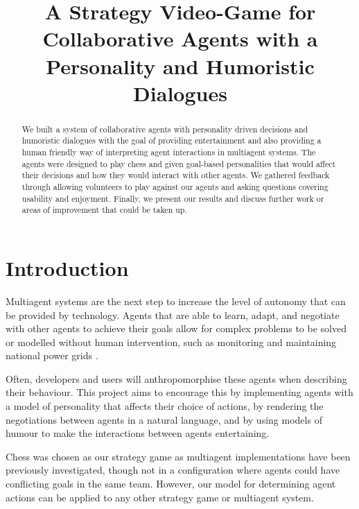\documentclass[conference]{IEEEtran}
\begin{document}
\title{A Strategy Video-Game for Collaborative Agents with a Personality and Humoristic Dialogues\\
}

\author{
\and
{}
\and
{}
}

\maketitle

\begin{abstract}

	We built a system of collaborative agents with personality driven decisions and humoristic dialogues with the goal of providing entertainment and also providing a human friendly way of interpreting agent interactions in multiagent systems. The agents were designed to play chess and given goal-based personalities that would affect their decisions and how they would interact with other agents. We gathered feedback through allowing volunteers to play against our agents and asking questions covering usability and enjoyment. Finally, we present our results and discuss further work or areas of improvement that could be taken up.

\end{abstract}

\section{Introduction}

Multiagent systems are the next step to increase the level of autonomy that can be provided by technology. Agents that are able to learn, adapt, and negotiate with other agents to achieve their goals allow for complex problems to be solved or modelled without human intervention, such as monitoring and maintaining national power grids \cite{archon}. 

Often, developers and users will anthropomorphise these agents when describing their behaviour. This project aims to encourage this by implementing agents with a model of personality that affects their choice of actions, by rendering the negotiations between agents in a natural language, and by using models of humour to make the interactions between agents entertaining. 

Chess was chosen as our strategy game as multiagent implementations have been previously investigated, though not in a configuration where agents could have conflicting goals in the same team. However, our model for determining agent actions can be applied to any other strategy game or multiagent system.
\end{document}
